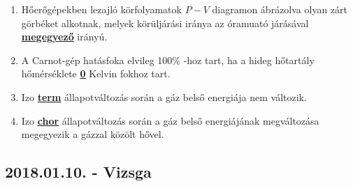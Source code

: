 \documentclass[../../fizika_kerdesek.tex]{subfiles}
\begin{document}
{\begin{enumerate}
                \item Hőerőgépekben lezajló körfolyamatok $P-V$ diagramon ábrázolva olyan zárt görbéket alkotnak, melyek körüljárási iránya az óramuató járásával \underline{\textbf{megegyező}} irányú.
                \item A Carnot-gép hatásfoka elvileg 100\% -hoz tart, ha a hideg hőtartály hőmérséklete \underline{\textbf{0}} Kelvin fokhoz tart.
                \item Izo \underline{\textbf{term}} állapotváltozás során a gáz belső energiája nem változik.
                \item Izo \underline{\textbf{chor}} állapotváltozás során a gáz belső energiájának megváltozása megegyezik a gázzal közölt hővel.
            \end{enumerate}}

    \subsection{2018.01.10. - Vizsga}
\end{document}
